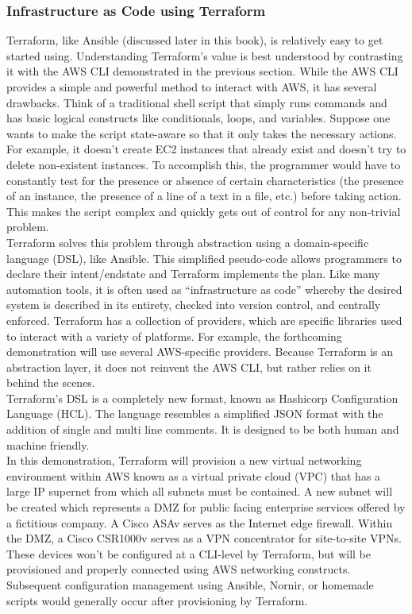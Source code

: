 \subsubsection{Infrastructure as Code using Terraform}
Terraform, like Ansible (discussed later in this book), is relatively easy to
get started using. Understanding Terraform's value is best understood by
contrasting it with the AWS CLI demonstrated in the previous section. While
the AWS CLI provides a simple and powerful method to interact with AWS, it has
several drawbacks. Think of a traditional shell script that simply runs
commands and has basic logical constructs like conditionals, loops, and
variables. Suppose one wants to make the script state-aware so that it only
takes the necessary actions. For example, it doesn't create EC2 instances that
already exist and doesn't try to delete non-existent instances. To accomplish
this, the programmer would have to constantly test for the presence or absence
of certain characteristics (the presence of an instance, the presence of a
line of a text in a file, etc.) before taking action. This makes the script
complex and quickly gets out of control for any non-trivial problem. \\

Terraform solves this problem through abstraction using a domain-specific
language (DSL), like Ansible. This simplified pseudo-code allows programmers
to declare their intent/endstate and Terraform implements the plan. Like many
automation tools, it is often used as ``infrastructure as code'' whereby the
desired system is described in its entirety, checked into version control, and
centrally enforced. Terraform has a collection of providers, which are
specific libraries used to interact with a variety of platforms. For example,
the forthcoming demonstration will use several AWS-specific providers. Because
Terraform is an abstraction layer, it does not reinvent the AWS CLI, but
rather relies on it behind the scenes. \\

Terraform's DSL is a completely new format, known as Hashicorp Configuration
Language (HCL). The language resembles a simplified JSON format with the
addition of single and multi line comments. It is designed to be both human
and machine friendly. \\

In this demonstration, Terraform will provision a new virtual networking
environment within AWS known as a virtual private cloud (VPC) that has a large
IP supernet from which all subnets must be contained. A new subnet will be
created which represents a DMZ for public facing enterprise services offered
by a fictitious company. A Cisco ASAv serves as the Internet edge firewall.
Within the DMZ, a Cisco CSR1000v serves as a VPN concentrator for site-to-site
VPNs. These devices won't be configured at a CLI-level by Terraform, but will
be provisioned and properly connected using AWS networking constructs.
Subsequent configuration management using Ansible, Nornir, or homemade scripts
would generally occur after provisioning by Terraform. \\

